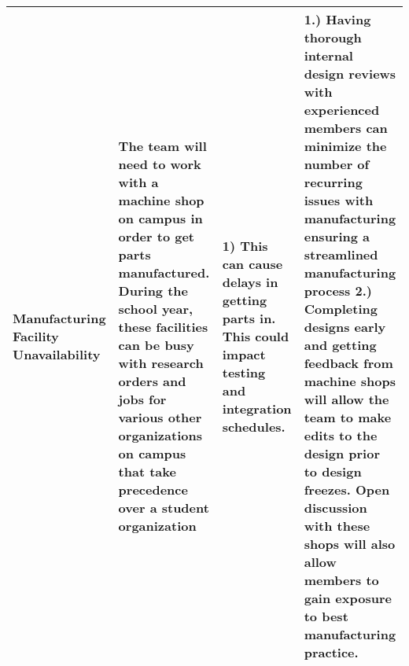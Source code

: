 \begin{table}[]
{\begin{tabularx}{\linewidth}{XXXX}
    Manufacturing Facility Unavailability & The team will need to work with a machine shop on campus in order to get parts manufactured. During the school year, these facilities can be busy with research orders and jobs for various other organizations on campus that take precedence over a student organization & 1) This can cause delays in getting parts in. This could impact testing and integration schedules. & 1.) Having thorough internal design reviews with experienced members can minimize the number of recurring issues with manufacturing ensuring a streamlined manufacturing process 2.) Completing designs early and getting feedback from machine shops will allow the team to make edits to the design prior to design freezes. Open discussion with these shops will also allow members to gain exposure to best manufacturing practice. \\ \bottomrule
    \bottomrule
    \end{tabularx}
    }
\end{table}
